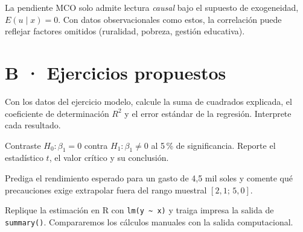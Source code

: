 \documentclass{evaluacion}
\begin{document}
\begin{observacion}
La pendiente MCO solo admite lectura \emph{causal} bajo el supuesto de
exogeneidad, $E(u\mid x)=0$. Con datos observacionales como estos, la
correlación puede reflejar factores omitidos (ruralidad, pobreza,
gestión educativa).
\end{observacion}

\section*{\color{colorprimario}B · Ejercicios propuestos}

\begin{ejercicio}
Con los datos del ejercicio modelo, calcule la suma de cuadrados
explicada, el coeficiente de determinación $R^{2}$ y el error estándar de
la regresión. Interprete cada resultado.
\end{ejercicio}

\begin{ejercicio}[][Inferencia]
Contraste $H_0\colon \beta_1 = 0$ contra $H_1\colon \beta_1 \neq 0$ al
5\,\% de significancia. Reporte el estadístico $t$, el valor crítico y su
conclusión.
\end{ejercicio}

\begin{ejercicio}[][Predicción]
Prediga el rendimiento esperado para un gasto de 4,5 mil soles y comente
qué precauciones exige extrapolar fuera del rango muestral
$[2{,}1;\,5{,}0]$.
\end{ejercicio}

\begin{observacion}
Replique la estimación en R con \texttt{lm(y \textasciitilde{} x)} y
traiga impresa la salida de \texttt{summary()}. Compararemos los cálculos
manuales con la salida computacional.
\end{observacion}

\findelexamen
\end{document}
